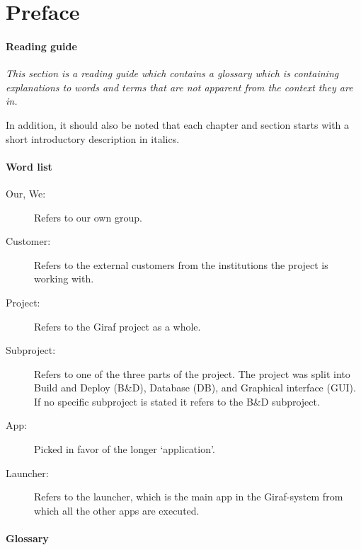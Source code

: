 \chapter*{Preface}

\subsubsection{Reading guide}
\textit{This section is a reading guide which contains a glossary which is containing explanations to words and terms that are not apparent from the context they are in.}

In addition, it should also be noted that each chapter and section starts with a short introductory description in italics.

\subsubsection{Word list}

\begin{description}
  \item[Our, We:] Refers to our own group.
  
  \item[Customer:] Refers to the external customers from the institutions the project is working with.
  
  \item[Project:] Refers to the Giraf project as a whole.
  
  \item[Subproject:] Refers to one of the three parts of the project. The project was split into Build and Deploy (B\&D), Database (DB), and Graphical interface (GUI). If no specific subproject is stated it refers to the B\&D subproject.
  
  \item[App:] Picked in favor of the longer ‘application’.
  
  \item[Launcher:] Refers to the launcher, which is the main app in the Giraf-system from which all the other apps are executed.
\end{description}

\subsubsection{Glossary}

